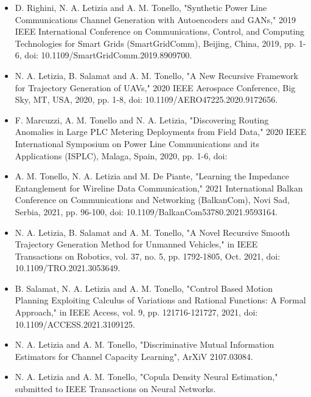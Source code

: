 \begin{itemize}
    \item D. Righini, N. A. Letizia and A. M. Tonello, "Synthetic Power Line Communications Channel Generation with Autoencoders and GANs," 2019 IEEE International Conference on Communications, Control, and Computing Technologies for Smart Grids (SmartGridComm), Beijing, China, 2019, pp. 1-6, doi: 10.1109/SmartGridComm.2019.8909700.
     \item N. A. Letizia, B. Salamat and A. M. Tonello, "A New Recursive Framework for Trajectory Generation of UAVs," 2020 IEEE Aerospace Conference, Big Sky, MT, USA, 2020, pp. 1-8, doi: 10.1109/AERO47225.2020.9172656.
	\item F. Marcuzzi, A. M. Tonello and N. A. Letizia, "Discovering Routing Anomalies in Large PLC Metering Deployments from Field Data," 2020 IEEE International Symposium on Power Line Communications and its Applications (ISPLC), Malaga, Spain, 2020, pp. 1-6, doi:
         \item A. M. Tonello, N. A. Letizia and M. De Piante, "Learning the Impedance Entanglement for Wireline Data Communication," 2021 International Balkan Conference on Communications and Networking (BalkanCom), Novi Sad, Serbia, 2021, pp. 96-100, doi: 10.1109/BalkanCom53780.2021.9593164.
         
      \item N. A. Letizia, B. Salamat and A. M. Tonello, "A Novel Recursive Smooth Trajectory Generation Method for Unmanned Vehicles," in IEEE Transactions on Robotics, vol. 37, no. 5, pp. 1792-1805, Oct. 2021, doi: 10.1109/TRO.2021.3053649.
	\item B. Salamat, N. A. Letizia and A. M. Tonello, "Control Based Motion Planning Exploiting Calculus of Variations and Rational Functions: A Formal Approach," in IEEE Access, vol. 9, pp. 121716-121727, 2021, doi: 10.1109/ACCESS.2021.3109125.
	\item N. A. Letizia and A. M. Tonello, "Discriminative Mutual Information Estimators for Channel Capacity Learning", ArXiV 2107.03084.
     \item N. A. Letizia and A. M. Tonello, "Copula Density Neural Estimation," submitted to IEEE Transactions on Neural Networks.
\end{itemize}